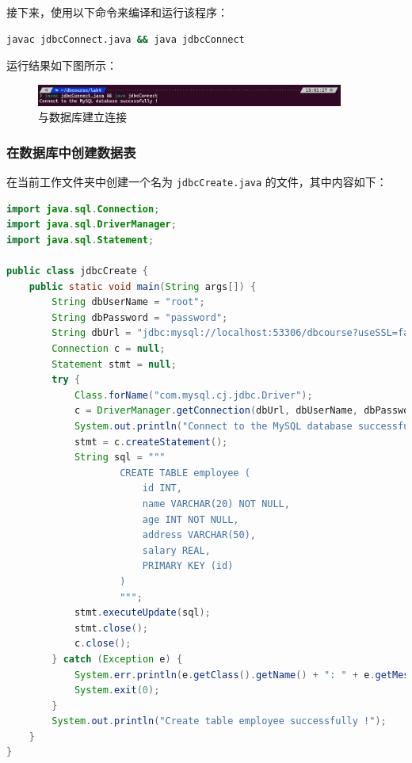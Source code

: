 \documentclass{article}
\renewcommand\tt{\texttt}
\begin{document}
接下来，使用以下命令来编译和运行该程序：

\begin{lstlisting}[language=bash]
javac jdbcConnect.java && java jdbcConnect
\end{lstlisting}

运行结果如下图所示：

\begin{figure}[H]
  \centering
  \includegraphics[width=0.9\textwidth]{img/5.png}
  \caption{与数据库建立连接}
\end{figure}

\subsubsection{在数据库中创建数据表}

在当前工作文件夹中创建一个名为 \tt{jdbcCreate.java} 的文件，其中内容如下：

\begin{lstlisting}[language=java]
import java.sql.Connection;
import java.sql.DriverManager;
import java.sql.Statement;

public class jdbcCreate {
    public static void main(String args[]) {
        String dbUserName = "root";
        String dbPassword = "password";
        String dbUrl = "jdbc:mysql://localhost:53306/dbcourse?useSSL=false&allowPublicKeyRetrieval=true";
        Connection c = null;
        Statement stmt = null;
        try {
            Class.forName("com.mysql.cj.jdbc.Driver");
            c = DriverManager.getConnection(dbUrl, dbUserName, dbPassword);
            System.out.println("Connect to the MySQL database successfully!");
            stmt = c.createStatement();
            String sql = """
                    CREATE TABLE employee (
                        id INT,
                        name VARCHAR(20) NOT NULL,
                        age INT NOT NULL,
                        address VARCHAR(50),
                        salary REAL,
                        PRIMARY KEY (id)
                    )
                    """;
            stmt.executeUpdate(sql);
            stmt.close();
            c.close();
        } catch (Exception e) {
            System.err.println(e.getClass().getName() + ": " + e.getMessage());
            System.exit(0);
        }
        System.out.println("Create table employee successfully !");
    }
}
\end{lstlisting}
\end{document}
